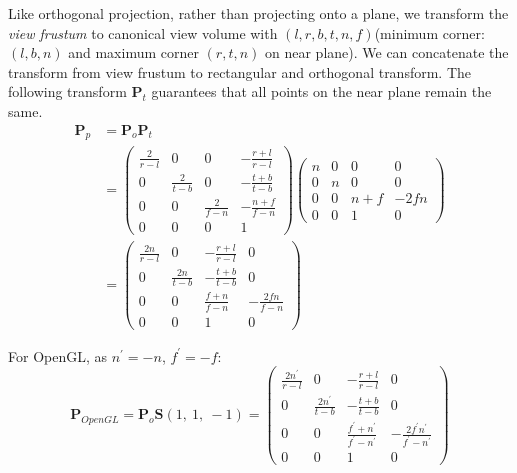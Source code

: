 \documentclass[10pt, a4paper]{article}
\begin{document}
            Like orthogonal projection, rather than projecting onto a plane, we transform the \emph{view frustum} to canonical view volume with $(l, r, b, t, n, f)$(minimum corner: $(l, b, n)$ and maximum corner $(r, t, n)$ on near plane). We can concatenate the transform from view frustum to rectangular and orthogonal transform. The following transform $\textbf{P}_t$ guarantees that all points on the near plane remain the same. 
            \begin{align*}
                \textbf{P}_p &= \textbf{P}_o\textbf{P}_t\\
                &= \begin{pmatrix}
                    \frac{2}{r - l} & 0 & 0 & -\frac{r + l}{r - l}\\
                    0 & \frac{2}{t - b} & 0 & -\frac{t + b}{t - b}\\
                    0 & 0 & \frac{2}{f - n} & -\frac{n + f}{f - n}\\
                    0 & 0 & 0 & 1
                \end{pmatrix}
                \begin{pmatrix}
                    n & 0 & 0 & 0\\
                    0 & n & 0 & 0\\
                    0 & 0 & n + f & -2fn\\
                    0 & 0 & 1 & 0
                \end{pmatrix}\\
                &=\begin{pmatrix}
                    \frac{2n}{r - l} & 0 & -\frac{r + l}{r - l} & 0\\
                    0 & \frac{2n}{t - b} & -\frac{t + b}{t - b} & 0\\
                    0 & 0 & \frac{f + n}{f - n} & -\frac{2fn}{f - n}\\
                    0 & 0 & 1 & 0
                \end{pmatrix}
            \end{align*} 

            For OpenGL, as $n^{'} = -n$, $f^{'} = -f$:
            \begin{equation*}
                \textbf{P}_{OpenGL} = \textbf{P}_o\textbf{S}(1,\ 1,\ -1) = 
                \begin{pmatrix}
                    \frac{2n^{'}}{r - l} & 0 & -\frac{r + l}{r - l} & 0\\
                    0 & \frac{2n^{'}}{t - b} & -\frac{t + b}{t - b} & 0\\
                    0 & 0 & \frac{f^{'} + n^{'}}{f^{'} - n^{'}} & -\frac{2f^{'}n^{'}}{f^{'} - n^{'}}\\
                    0 & 0 & 1 & 0
                \end{pmatrix}
            \end{equation*}
        
\end{document}
